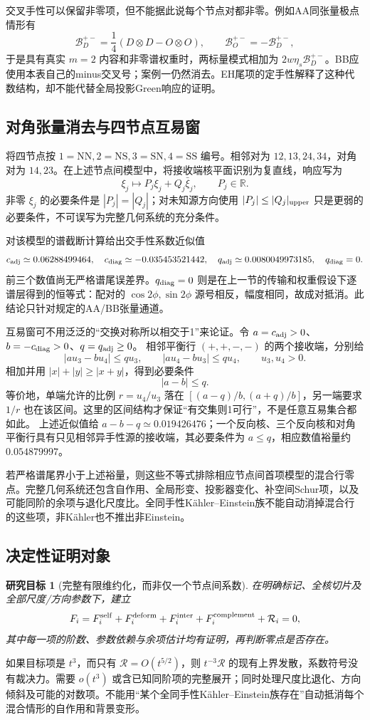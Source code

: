 \documentclass[UTF8,a4paper,11pt,fontset=fandol]{ctexart}
\numberwithin{equation}{section}
\newtheorem{target}[theorem]{研究目标}
\theoremstyle{definition}
\newcommand{\R}{\mathbb R}
\begin{document}
交叉手性可以保留非零项，但不能据此说每个节点对都非零。例如AA同张量极点情形有
\[
\mathcal B_D^{+-}=\frac14(D\otimes D-O\otimes O),\qquad
\mathcal B_O^{+-}=-\mathcal B_D^{+-},
\]
于是具有真实 $m=2$ 内容和非零谱权重时，两标量模式相加为 $2w\eta_s\mathcal B_D^{+-}$。BB应使用本表自己的minus交叉号；案例一仍然消去。EH尾项的定手性解释了这种代数结构，却不能代替全局投影Green响应的证明。

\subsection{对角张量消去与四节点互易窗}
将四节点按 $1=\mathrm{NN},2=\mathrm{NS},3=\mathrm{SN},4=\mathrm{SS}$ 编号。相邻对为 $12,13,24,34$，对角对为 $14,23$。在上述节点间模型中，将接收端核平面识别为复直线，响应写为
\[
\xi_j\longmapsto P_j\xi_j+Q_j\bar\xi_j,
\qquad P_j\in\R.
\]
非零 $\xi_j$ 的必要条件是 $|P_j|=|Q_j|$；对未知源方向使用 $|P_j|\le |Q_j|_{\rm upper}$ 只是更弱的必要条件，不可误写为完整几何系统的充分条件。

对该模型的谱截断计算给出交手性系数近似值
\[
c_{\rm adj}\simeq0.06288499464,\quad
c_{\rm diag}\simeq-0.035453521442,\quad
q_{\rm adj}\simeq0.0080049973185,\quad q_{\rm diag}=0.
\]
前三个数值尚无严格谱尾误差界。$q_{\rm diag}=0$ 则是在上一节的传输和权重假设下逐谱层得到的恒等式：配对的 $\cos2\phi,\sin2\phi$ 源号相反，幅度相同，故成对抵消。此结论只针对规定的AA/BB张量通道。

互易窗可不用泛泛的“交换对称所以相交于1”来论证。令
$a=c_{\rm adj}>0$、$b=-c_{\rm diag}>0$、$q=q_{\rm adj}\ge0$。
相邻平衡行 $(+,+,-,-)$ 的两个接收端，分别给
\[
|au_3-bu_4|\le qu_3,\qquad |au_4-bu_3|\le qu_4,
\qquad u_3,u_4>0.
\]
相加并用 $|x|+|y|\ge|x+y|$，得到必要条件
\[
|a-b|\le q.
\]
等价地，单端允许的比例 $r=u_4/u_3$ 落在
$[(a-q)/b,(a+q)/b]$，另一端要求 $1/r$ 也在该区间。这里的区间结构才保证“有交集则1可行”，不是任意互易集合都如此。
上述近似值给 $a-b-q\simeq0.019426476$；一个反向核、三个反向核和对角平衡行具有只见相邻异手性源的接收端，其必要条件为 $a\le q$，相应数值裕量约 $0.054879997$。

若严格谱尾界小于上述裕量，则这些不等式排除相应节点间首项模型的混合行零点。完整几何系统还包含自作用、全局形变、投影器变化、补空间Schur项，以及可能同阶的余项与退化尺度比。全同手性K\"ahler--Einstein族不能自动消掉混合行的这些项，非K\"ahler也不推出非Einstein。

\subsection{决定性证明对象}
\begin{target}[完整有限维约化，而非仅一个节点间系数]
在明确标记、全核切片及全部尺度/方向参数下，建立
\begin{equation}\label{eq:LS}
F_i=F_i^{\rm self}+F_i^{\rm deform}+F_i^{\rm inter}
+F_i^{\rm complement}+\mathcal R_i=0,
\end{equation}
其中每一项的阶数、参数依赖与余项估计均有证明，再判断零点是否存在。
\end{target}
如果目标项是 $t^3$，而只有 $\mathcal R=O(t^{5/2})$，则 $t^{-3}\mathcal R$ 的现有上界发散，系数符号没有裁决力。需要 $o(t^3)$ 或含已知同阶项的完整展开；同时处理尺度比退化、方向倾斜及可能的对数项。不能用“某个全同手性K\"ahler--Einstein族存在”自动抵消每个混合情形的自作用和背景变形。
\end{document}
